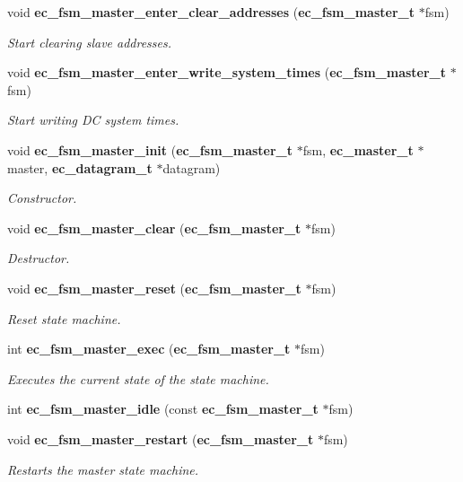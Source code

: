 \begin{DoxyCompactItemize}
void {\bf ec\-\_\-fsm\-\_\-master\-\_\-enter\-\_\-clear\-\_\-addresses} ({\bf ec\-\_\-fsm\-\_\-master\-\_\-t} $\ast$fsm)
\begin{DoxyCompactList}\small\item\em \-Start clearing slave addresses. \end{DoxyCompactList}\item 
void {\bf ec\-\_\-fsm\-\_\-master\-\_\-enter\-\_\-write\-\_\-system\-\_\-times} ({\bf ec\-\_\-fsm\-\_\-master\-\_\-t} $\ast$fsm)
\begin{DoxyCompactList}\small\item\em \-Start writing \-D\-C system times. \end{DoxyCompactList}\item 
void {\bf ec\-\_\-fsm\-\_\-master\-\_\-init} ({\bf ec\-\_\-fsm\-\_\-master\-\_\-t} $\ast$fsm, {\bf ec\-\_\-master\-\_\-t} $\ast$master, {\bf ec\-\_\-datagram\-\_\-t} $\ast$datagram)
\begin{DoxyCompactList}\small\item\em \-Constructor. \end{DoxyCompactList}\item 
void {\bf ec\-\_\-fsm\-\_\-master\-\_\-clear} ({\bf ec\-\_\-fsm\-\_\-master\-\_\-t} $\ast$fsm)
\begin{DoxyCompactList}\small\item\em \-Destructor. \end{DoxyCompactList}\item 
void {\bf ec\-\_\-fsm\-\_\-master\-\_\-reset} ({\bf ec\-\_\-fsm\-\_\-master\-\_\-t} $\ast$fsm)
\begin{DoxyCompactList}\small\item\em \-Reset state machine. \end{DoxyCompactList}\item 
int {\bf ec\-\_\-fsm\-\_\-master\-\_\-exec} ({\bf ec\-\_\-fsm\-\_\-master\-\_\-t} $\ast$fsm)
\begin{DoxyCompactList}\small\item\em \-Executes the current state of the state machine. \end{DoxyCompactList}\item 
int {\bf ec\-\_\-fsm\-\_\-master\-\_\-idle} (const {\bf ec\-\_\-fsm\-\_\-master\-\_\-t} $\ast$fsm)
\item 
void {\bf ec\-\_\-fsm\-\_\-master\-\_\-restart} ({\bf ec\-\_\-fsm\-\_\-master\-\_\-t} $\ast$fsm)
\begin{DoxyCompactList}\small\item\em \-Restarts the master state machine. \end{DoxyCompactList}\item 

\end{DoxyCompactItemize}
